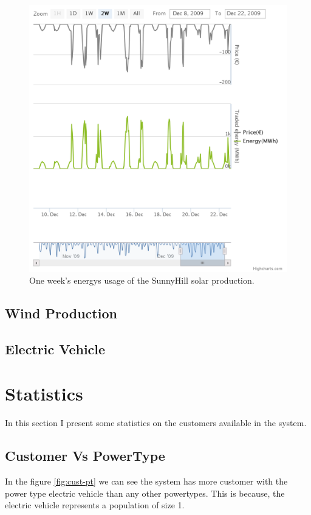 \begin{figure}[h!]
  \includegraphics[width=\linewidth]{sunnyhill-oneweek.png}
  \caption{One week's energys usage of the SunnyHill solar production.}
  \label{fig:solar-oneweek}
\end{figure}

\subsection{Wind Production}

\subsection {Electric Vehicle}


\section{Statistics}
In this section I present some statistics on the customers available in the system. 

\subsection {Customer Vs PowerType}

In the figure \ref{fig:cust-pt} we can see the system has more customer with the power type electric vehicle than any other powertypes. This is because, the electric vehicle represents a population of size 1.

